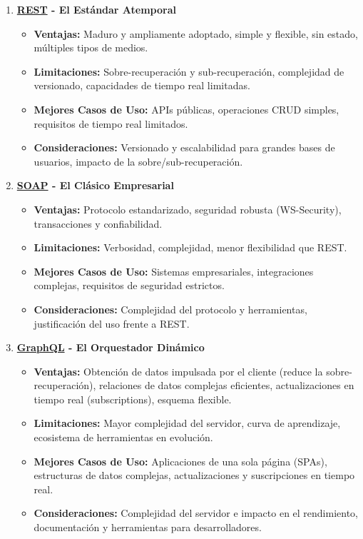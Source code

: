 \begin{enumerate}
    \item \textbf{\hyperlink{rest}{REST} - El Estándar Atemporal}
    \begin{itemize}
        \item \textbf{Ventajas:} Maduro y ampliamente adoptado, simple y flexible, sin estado, múltiples tipos de medios.
        \item \textbf{Limitaciones:} Sobre-recuperación y sub-recuperación, complejidad de versionado, capacidades de tiempo real limitadas.
        \item \textbf{Mejores Casos de Uso:} APIs públicas, operaciones CRUD simples, requisitos de tiempo real limitados.
        \item \textbf{Consideraciones:} Versionado y escalabilidad para grandes bases de usuarios, impacto de la sobre/sub-recuperación.
    \end{itemize}

    \item \textbf{\hyperlink{soap}{SOAP} - El Clásico Empresarial}
    \begin{itemize}
        \item \textbf{Ventajas:} Protocolo estandarizado, seguridad robusta (WS-Security), transacciones y confiabilidad.
        \item \textbf{Limitaciones:} Verbosidad, complejidad, menor flexibilidad que REST.
        \item \textbf{Mejores Casos de Uso:} Sistemas empresariales, integraciones complejas, requisitos de seguridad estrictos.
        \item \textbf{Consideraciones:} Complejidad del protocolo y herramientas, justificación del uso frente a REST.
    \end{itemize}

    \item \textbf{\hyperlink{graphql}{GraphQL} - El Orquestador Dinámico}
    \begin{itemize}
        \item \textbf{Ventajas:} Obtención de datos impulsada por el cliente (reduce la sobre-recuperación), relaciones de datos complejas eficientes, actualizaciones en tiempo real (subscriptions), esquema flexible.
        \item \textbf{Limitaciones:} Mayor complejidad del servidor, curva de aprendizaje, ecosistema de herramientas en evolución.
        \item \textbf{Mejores Casos de Uso:} Aplicaciones de una sola página (SPAs), estructuras de datos complejas, actualizaciones y suscripciones en tiempo real.
        \item \textbf{Consideraciones:} Complejidad del servidor e impacto en el rendimiento, documentación y herramientas para desarrolladores.
    \end{itemize}


\end{enumerate}
